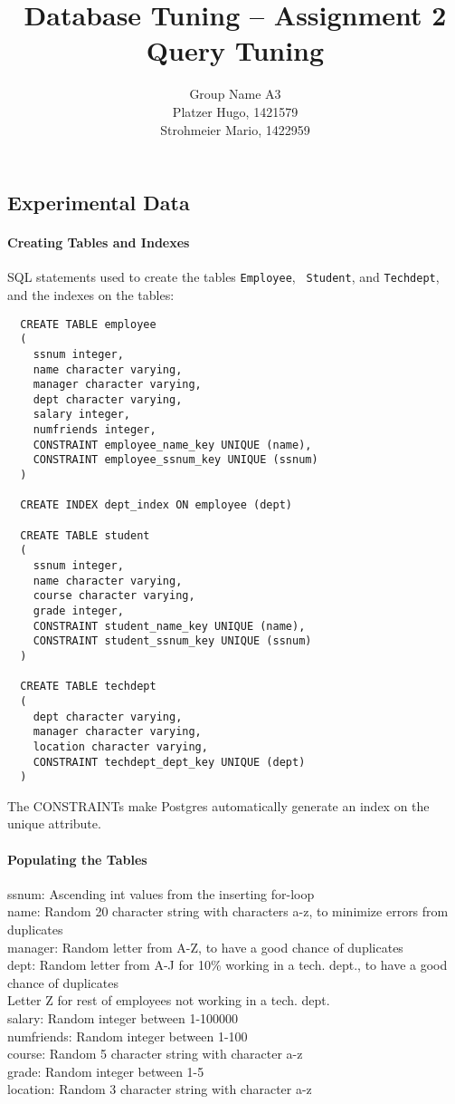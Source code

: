 \documentclass[11pt]{scrartcl}
\title{
  \textbf{\large Database Tuning -- Assignment 2}\\
  Query Tuning
}
\author{
 Group Name A3\\
 \large Platzer Hugo, 1421579 \\
 \large Strohmeier Mario, 1422959
}
\begin{document}
\maketitle

\subsection*{Experimental Data}

\paragraph{Creating Tables and Indexes}

SQL statements used to create the tables {\tt Employee}, {\tt
  Student}, and {\tt Techdept}, and the indexes on the tables:

{\small
\begin{verbatim}
  CREATE TABLE employee
  (
    ssnum integer,
    name character varying,
    manager character varying,
    dept character varying,
    salary integer,
    numfriends integer,
    CONSTRAINT employee_name_key UNIQUE (name),
    CONSTRAINT employee_ssnum_key UNIQUE (ssnum)
  )

  CREATE INDEX dept_index ON employee (dept)

  CREATE TABLE student
  (
    ssnum integer,
    name character varying,
    course character varying,
    grade integer,
    CONSTRAINT student_name_key UNIQUE (name),
    CONSTRAINT student_ssnum_key UNIQUE (ssnum)
  )

  CREATE TABLE techdept
  (
    dept character varying,
    manager character varying,
    location character varying,
    CONSTRAINT techdept_dept_key UNIQUE (dept)
  )
\end{verbatim}
}

The CONSTRAINTs make Postgres automatically generate an index on the
unique attribute.

\paragraph{Populating the Tables}

ssnum: Ascending int values from the inserting for-loop\\
name: Random 20 character string with characters a-z, to minimize errors from duplicates\\
manager: Random letter from A-Z, to have a good chance of duplicates\\
dept: Random letter from A-J for 10\% working in a tech. dept.,
to have a good chance of duplicates\\
Letter Z for rest of employees not working in a tech. dept.\\
salary: Random integer between 1-100000\\
numfriends: Random integer between 1-100\\
course: Random 5 character string with character a-z\\
grade: Random integer between 1-5\\
location: Random 3 character string with character a-z\\
\end{document}
